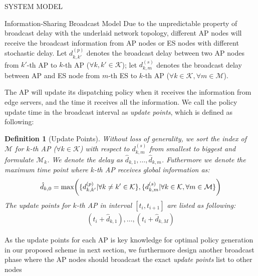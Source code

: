 \documentclass[10pt, conference, letterpaper]{IEEEtran}
\newtheorem{definition}{Definition}
\DeclarePairedDelimiter{\set}{\{}{\}}
\DeclarePairedDelimiter{\Paren}{\bigg(}{\bigg)}
\newcommand{\apSet}{\mathcal{K}}
\newcommand{\esSet}{\mathcal{M}}
\begin{document}
\begin{section}{SYSTEM MODEL}
\begin{subsection}{Information-Sharing Broadcast Model}
            {\color{red}Due to the unpredictable property of broadcast delay with the underlaid network topology, different AP nodes will receive the broadcast information from AP nodes or ES nodes with different stochastic delay.}
            Let $d^{(p)}_{k,k'}$ denotes the broadcast delay between two AP nodes from $k'$-th AP to $k$-th AP ($\forall k,k'\in\apSet$); let $d^{(s)}_{k,m}$ denotes the broadcast delay between AP and ES node from $m$-th ES to $k$-th AP ($\forall k\in\apSet,\forall m\in\esSet$).
            
            The AP will update its dispatching policy when it receives the information from edge servers, and the time it receives all the information. We call the policy update time in the broadcast interval as \emph{update points}, which is defined as following:
            \begin{definition}[Update Points]
                Without loss of generality, we sort the index of $\esSet$ for $k$-th AP ($\forall k\in\apSet$) with respect to $d^{(s)}_{k,m}$ from smallest to biggest and formulate $\esSet_{k}$. We denote the delay as $\hat{d}_{k,1}, \dots,\hat{d}_{k,m}$.
                Futhermore we denote the maximum time point where $k$-th AP receives global information as:
                \begin{align}
                    \hat{d}_{k,0} = \max\Paren{
                        \set{d^{(p)}_{k,k'}|\forall k \neq k' \in\apSet},
                        \set{d^{(s)}_{k,m}|\forall k\in\apSet,\forall m\in\esSet}
                    }
                \end{align}
                The update points for $k$-th AP in interval $[t_{i}, t_{i+1}]$ are listed as following:
                \begin{align}
                    (t_i+\hat{d}_{k,1}),
                    \dots,
                    (t_i+\hat{d}_{k,M})
                \end{align}
            \end{definition}

            As the update points for each AP is key knowledge for optimal policy generation in our proposed scheme in next section, we furthermore design another broadcast phase where the AP nodes should broadcast the exact \emph{update points} list to other nodes


\end{subsection}
\end{section}
\end{document}
